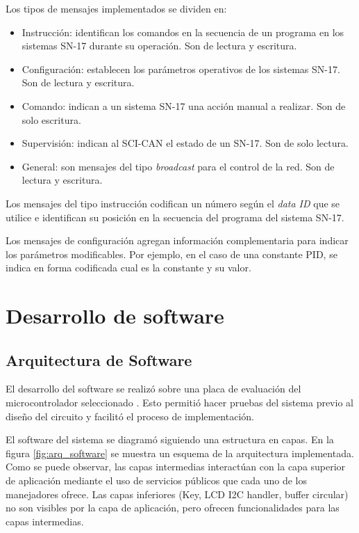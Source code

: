 \newpage

Los tipos de mensajes implementados se dividen en:
\begin{itemize}
	\item Instrucción: identifican los comandos en la secuencia de un programa en los sistemas SN-17 durante su operación. Son de lectura y escritura.
	\item Configuración: establecen los parámetros operativos de los sistemas SN-17. Son de lectura y escritura.
	\item Comando: indican a un sistema SN-17 una acción manual a realizar. Son de solo escritura.
	\item Supervisión: indican al SCI-CAN el estado de un SN-17. Son de solo lectura.
	\item General: son mensajes del tipo \textit{broadcast} para el control de la red. Son de lectura y escritura.
\end{itemize}

Los mensajes del tipo instrucción codifican un número según el \textit{data ID} que se utilice e identifican su posición en la secuencia del programa del sistema SN-17.

Los mensajes de configuración agregan información complementaria para indicar los parámetros modificables. Por ejemplo, en el caso de una constante PID, se indica en forma codificada cual es la constante y su valor. 

\section{Desarrollo de software}
\label{desarrollo_software}

\subsection{Arquitectura de Software}

El desarrollo del software se realizó sobre una placa de evaluación del microcontrolador seleccionado \citep{web_dev_board}. Esto permitió hacer pruebas del sistema previo al diseño del circuito y facilitó el proceso de implementación.

El software del sistema se diagramó siguiendo una estructura en capas. En la figura \ref{fig:arq_software} se muestra un esquema de la arquitectura implementada. Como se puede observar, las capas intermedias interactúan con la capa superior de aplicación mediante el uso de servicios públicos que cada uno de los manejadores ofrece. Las capas inferiores (Key, LCD I2C handler, buffer circular) no son visibles por la capa de aplicación, pero ofrecen funcionalidades para las capas intermedias. 

